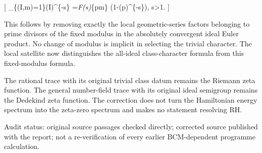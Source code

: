 \documentclass[
]{article}
\begin{document}
{[} \sum\_\{(I,\mathfrak m)=1\}(I)\^{}\{-s\}
=\zeta\emph{F(s)\prod}\{\mathfrak p\mid\mathfrak m\}
\left(1-(\mathfrak p)\^{}\{-s\}\right),
\qquad \Re s\textgreater1. {]}

This follows by removing exactly the local geometric-series factors
belonging to prime divisors of the fixed modulus in the absolutely
convergent ideal Euler product. No change of modulus is implicit in
selecting the trivial character. The local satellite now distinguishes
the all-ideal class-character formula from this fixed-modulus formula.

The rational trace with its original trivial class datum remains the
Riemann zeta function. The general number-field trace with its original
ideal semigroup remains the Dedekind zeta function. The correction does
not turn the Hamiltonian energy spectrum into the zeta-zero spectrum and
makes no statement resolving RH.

Audit status: original source passages checked directly; corrected
source published with the report; not a re-verification of every earlier
BCM-dependent programme calculation.
\end{document}
